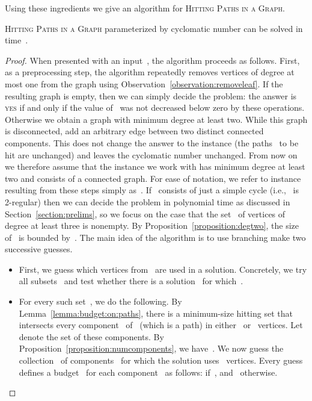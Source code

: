 \let\accentvec\vec  \documentclass{llncs}
\newcommand{\yes}{\textsc{yes}\xspace}
\newcommand{\HitPathsInGraph}{\textsc{Hitting Paths in a Graph}\xspace}
\begin{document}
Using these ingredients we give an algorithm for \HitPathsInGraph.

\begin{theorem} \label{theorem:pathsingraph:fpt}
\HitPathsInGraph parameterized by cyclomatic number can be solved in time~.
\end{theorem}
\begin{proof}
When presented with an input~, the algorithm proceeds as follows. First, as a preprocessing step, the algorithm repeatedly removes vertices of degree at most one from the graph using Observation~\ref{observation:removeleaf}. If the resulting graph is empty, then we can simply decide the problem: the answer is \yes if and only if the value of~ was not decreased below zero by these operations. Otherwise we obtain a graph with minimum degree at least two. While this graph is disconnected, add an arbitrary edge between two distinct connected components. This does not change the answer to the instance (the paths~ to be hit are unchanged) and leaves the cyclomatic number unchanged. From now on we therefore assume that the instance we work with has minimum degree at least two and consists of a connected graph. For ease of notation, we refer to instance resulting from these steps simply as~. If~ consists of just a simple cycle (i.e.,~ is 2-regular) then we can decide the problem in polynomial time as discussed in Section~\ref{section:prelims}, so we focus on the case that the set~ of vertices of degree at least three is nonempty. By Proposition~\ref{proposition:degtwo}, the size of~ is bounded by~. The main idea of the algorithm is to use branching make two successive guesses. 
\begin{itemize}
	\item First, we guess which vertices from~ are used in a solution. Concretely, we try all subsets~ and test whether there is a solution~ for which~. 
	\item For every such set~, we do the following. By Lemma~\ref{lemma:budget:on:paths}, there is a minimum-size hitting set that intersects every component~ of~ (which is a path) in either~ or~ vertices. Let~ denote the set of these components. By Proposition~\ref{proposition:numcomponents}, we have~. We now guess the collection~ of components~ for which the solution uses~ vertices. Every guess~ defines a budget~ for each component~ as follows:  if~, and~ otherwise.
\end{itemize}


\end{proof}
\end{document}
